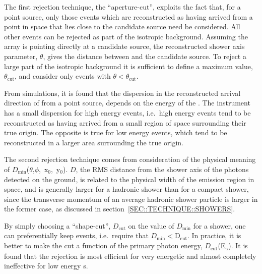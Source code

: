 The first rejection technique, the ``aperture-cut'', exploits the fact
that, for a point source, only those events which are reconstructed as
having arrived from a point in space that lies close to the candidate
source need be considered. All other events can be rejected as part of
the isotropic background. Assuming the array is pointing directly at a
candidate \Gray source, the reconstructed shower axis parameter,
$\theta$, gives the distance between \Gray and the candidate
source. To reject a large part of the isotropic background it is
sufficient to define a maximum value, $\theta_{\mathrm{cut}}$, and
consider only events with $\theta<\theta_{\mathrm{cut}}$.

From simulations, it is found that the dispersion in the reconstructed
arrival direction of \Grays from a point source, depends on the energy
of the \Grayc. The instrument has a small dispersion for high energy
events, i.e.\ high energy events tend to be reconstructed as having
arrived from a small region of space surrounding their true
origin. The opposite is true for low energy events, which tend to be
reconstructed in a larger area surrounding the true origin.

The second rejection technique comes from consideration of the
physical meaning of
\mbox{$D_{\mathrm{min}}$($\theta$,$\phi$, x$_0$, y$_0$)}. $D$, the
RMS distance from the shower axis of the photons detected on the
ground, is related to the physical width of the \Cerenkov emission
region in space, and is generally larger for a hadronic shower than
for a compact \Gray shower, since the transverse momentum of an
average hadronic shower particle is larger in the former case, as
discussed in section~\ref{SEC::TECHNIQUE::SHOWERS}.

By simply choosing a ``shape-cut'', $D_{\mathrm{cut}}$ on the value
of $D_{\mathrm{min}}$ for a shower, one can preferentially keep
\Gray events, i.e.\ require that
$D_{\mathrm{min}}<$D$_{\mathrm{cut}}$. In practice, it is better
to make the cut a function of the primary photon energy,
$D_{\mathrm{cut}}$(E$_\gamma$). It is found that the rejection is
most efficient for very energetic \Grays and almost completely
ineffective for low energy {\Grayc}s.

